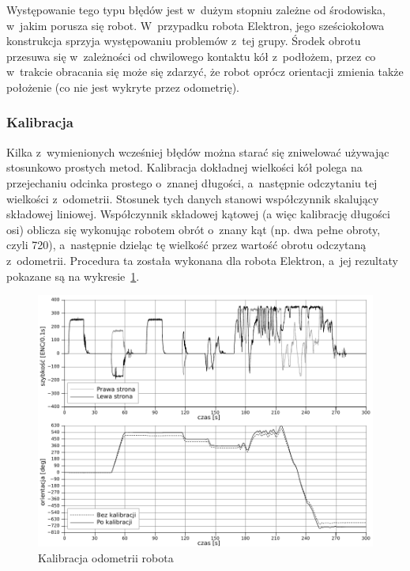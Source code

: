 Występowanie tego typu błędów jest w~dużym stopniu zależne od środowiska, 
w~jakim porusza się robot. W~przypadku robota Elektron, jego sześciokołowa
konstrukcja sprzyja występowaniu problemów z~tej grupy. Środek obrotu przesuwa
się w~zależności od chwilowego kontaktu kół z~podłożem, przez co w~trakcie
obracania się może się zdarzyć, że robot oprócz orientacji zmienia także
położenie (co nie jest wykryte przez odometrię).

\subsubsection{Kalibracja}

Kilka z~wymienionych wcześniej błędów można starać się zniwelować używając
stosunkowo prostych metod. Kalibracja dokładnej wielkości kół polega na
przejechaniu odcinka prostego o~znanej długości, a~następnie odczytaniu tej
wielkości z~odometrii. Stosunek tych danych stanowi współczynnik skalujący
składowej liniowej. Współczynnik składowej kątowej (a więc kalibrację długości
osi) oblicza się wykonując robotem obrót o~znany kąt (np. dwa pełne obroty,
czyli 720\textdegree), a~następnie dzieląc tę wielkość przez wartość obrotu
odczytaną z~odometrii. Procedura ta została wykonana dla robota Elektron, a~jej
rezultaty pokazane są na wykresie~\ref{fig:odom_calib}.

\begin{figure}[ht!]
\centering
\includegraphics[width=\textwidth]{../../Common/pomiary/odom_calib_bw}
\caption{Kalibracja odometrii robota}
\label{fig:odom_calib}
\end{figure}

